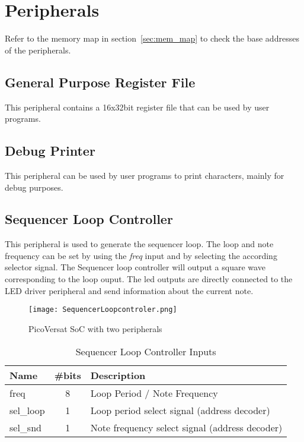 \section{Peripherals}
\label{sec:periphs}



Refer to the memory map in section~\ref{sec:mem_map} to check the base addresses
of the peripherals.

\subsection{General Purpose Register File}

This peripheral contains a 16x32bit register file that can be used by user
programs. 

\subsection{Debug Printer}

This peripheral can be used by user programs to print characters, mainly for
debug purposes. 

\subsection{Sequencer Loop Controller}

This peripheral is used to generate the sequencer loop. The loop and note frequency can be set by using the \textit{freq} input and by selecting the according selector signal.
The Sequencer loop controller will output a square wave corresponding to the loop ouput. The led outputs are directly connected to the LED driver peripheral and send information about the current note. 

\begin{figure}[!htbp]
    \centerline{\texttt{[image: SequencerLoopcontroler.png]}}
    \vspace{0cm}\caption{PicoVersat SoC with two peripherals}
    \label{fig:periphs}
\end{figure}

\begin{table}[h]
    \centering
    \caption{Sequencer Loop Controller Inputs}
    \label{tab:slcIn}
    \begin{tabular}{@{}lcl@{}}
    \toprule
    Name      & \multicolumn{1}{l}{\#bits} & Description                                    \\ \midrule
    freq & 8                          & Loop Period / Note Frequency                                    \\
    sel\_loop & 1                          & Loop period select signal (address decoder)    \\
    sel\_snd  & 1                          & Note frequency select signal (address decoder) \\ \bottomrule
    \end{tabular}
    \end{table}

